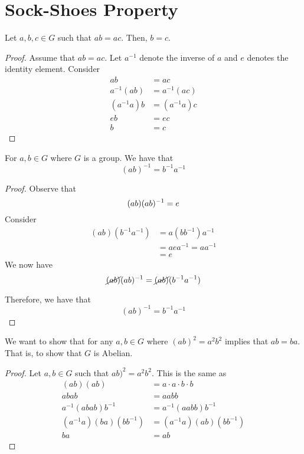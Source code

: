 \section{Sock-Shoes Property}

\begin{theorem}[Cancellation]
    Let \(a, b, c \in G\) such that \(ab = ac\). Then, \(b = c\).
\end{theorem}

\begin{proof}
    Assume that \(ab = ac\). Let \(a^{-1}\) denote the inverse of \(a\) and \(e\) denotes the identity element. Consider
    \[
    \begin{aligned}
        ab &= ac \\
        a^{-1}(ab) &= a^{-1}(ac) \\
        (a^{-1}a)b &= (a^{-1}a)c \\
        eb &= ec \\
        b &= c
    \end{aligned}
    \]
\end{proof}

\begin{theorem}
    For \(a, b \in G\) where \(G\) is a group. We have that
    \[
        (ab)^{-1} = b^{-1}a^{-1}
    \]
\end{theorem}

\begin{proof}
    Observe that
    \[
        (ab)(ab)^{-1} = e \\
    \]
    Consider
    \[
    \begin{aligned}
        (ab)(b^{-1}a^{-1}) &= a(bb^{-1})a^{-1} \\
                           &= aea^{-1} = aa^{-1} \\
                           &= e
    \end{aligned}
    \]
    We now have
    \[
        \cancel{(ab)}(ab)^{-1} = \cancel{(ab)}(b^{-1}a^{-1})
    \]

    Therefore, we have that
    \[
        (ab)^{-1} = b^{-1}a^{-1}
    \]
\end{proof}

\begin{nexample}
    We want to show that for any \(a, b \in G\) where \((ab)^2 = a^2b^2\) implies that \(ab = ba\). That is, to show that \(G\) is Abelian.

    \begin{proof}
        Let \(a, b \in G\) such that \(ab)^2 = a^2 b^2\). This is the same as
        \[
        \begin{aligned}
            (ab)(ab) &= a \cdot a \cdot b \cdot b \\
            abab &= aabb \\
            a^{-1}(abab)b^{-1} &= a^{-1}(aabb)b^{-1} \\
            (a^{-1}a)(ba)(bb^{-1}) &= (a^{-1}a)(ab)(bb^{-1}) \\
            ba &= ab
        \end{aligned}
        \]
    \end{proof}
\end{nexample}

